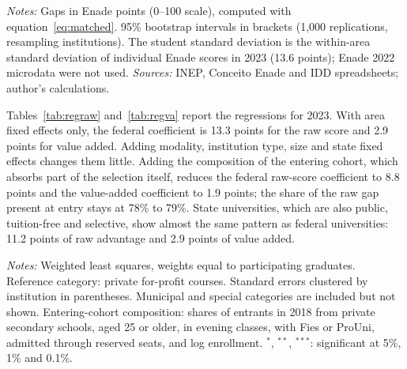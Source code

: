 \documentclass[12pt,letterpaper]{article}
\begin{document}
\begin{table}[!htbp]
\centering\small
\caption{Federal minus private courses of the same area, Enade 2022 and 2023}\label{tab:matched}

\begin{minipage}{\linewidth}\vspace{0.4em}\scriptsize
\textit{Notes:} Gaps in Enade points (0--100 scale), computed with equation~\eqref{eq:matched}. 95\% bootstrap intervals in brackets (1,000 replications, resampling institutions). The student standard deviation is the within-area standard deviation of individual Enade scores in 2023 (13.6 points); Enade 2022 microdata were not used. \textit{Sources:} INEP, Conceito Enade and IDD spreadsheets; author's calculations.
\end{minipage}
\end{table}

Tables~\ref{tab:regraw} and~\ref{tab:regva} report the regressions for 2023. With area fixed effects only, the federal coefficient is 13.3 points for the raw score and 2.9 points for value added. Adding modality, institution type, size and state fixed effects changes them little. Adding the composition of the entering cohort, which absorbs part of the selection itself, reduces the federal raw-score coefficient to 8.8 points and the value-added coefficient to 1.9 points; the share of the raw gap present at entry stays at 78\% to 79\%. State universities, which are also public, tuition-free and selective, show almost the same pattern as federal universities: 11.2 points of raw advantage and 2.9 points of value added.

\begin{table}[!htbp]
\centering\small
\caption{Raw Enade score: regressions on administrative category, Enade 2023}\label{tab:regraw}

\begin{minipage}{\linewidth}\vspace{0.4em}\scriptsize
\textit{Notes:} Weighted least squares, weights equal to participating graduates. Reference category: private for-profit courses. Standard errors clustered by institution in parentheses. Municipal and special categories are included but not shown. Entering-cohort composition: shares of entrants in 2018 from private secondary schools, aged 25 or older, in evening classes, with Fies or ProUni, admitted through reserved seats, and log enrollment. $^{*}$, $^{**}$, $^{***}$: significant at 5\%, 1\% and 0.1\%.
\end{minipage}
\end{table}
\end{document}
